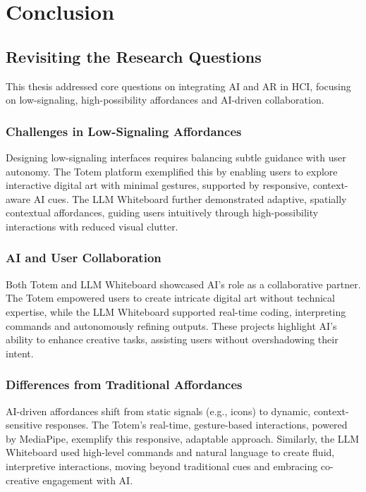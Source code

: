 \section{Conclusion}

\subsection{Revisiting the Research Questions}

This thesis addressed core questions on integrating AI and AR in HCI, focusing on low-signaling, high-possibility affordances and AI-driven collaboration.

\subsubsection{Challenges in Low-Signaling Affordances}
Designing low-signaling interfaces requires balancing subtle guidance with user autonomy.
The Totem platform exemplified this by enabling users to explore interactive digital art with minimal gestures, supported by responsive, context-aware AI cues.
The LLM Whiteboard further demonstrated adaptive, spatially contextual affordances, guiding users intuitively through high-possibility interactions with reduced visual clutter.

\subsubsection{AI and User Collaboration}
Both Totem and LLM Whiteboard showcased AI’s role as a collaborative partner.
The Totem empowered users to create intricate digital art without technical expertise, while the LLM Whiteboard supported real-time coding, interpreting commands and autonomously refining outputs.
These projects highlight AI's ability to enhance creative tasks, assisting users without overshadowing their intent.

\subsubsection{Differences from Traditional Affordances}
AI-driven affordances shift from static signals (e.g., icons) to dynamic, context-sensitive responses.
The Totem’s real-time, gesture-based interactions, powered by MediaPipe, exemplify this responsive, adaptable approach.
Similarly, the LLM Whiteboard used high-level commands and natural language to create fluid, interpretive interactions, moving beyond traditional cues and embracing co-creative engagement with AI.

